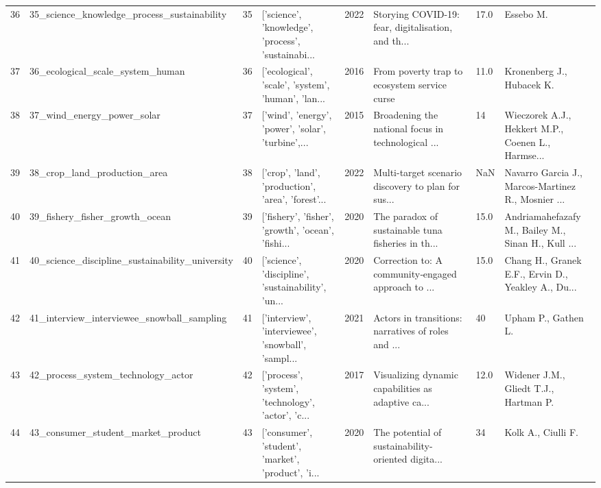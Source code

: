 \begin{tabular}{rlrlrlll}
         36 &        35\_science\_knowledge\_process\_sustainability &        35 & ['science', 'knowledge', 'process', 'sustainabi... &          2022 & Storying COVID-19: fear, digitalisation, and th... &    17.0 &                                          Essebo M. \\
         37 &                   36\_ecological\_scale\_system\_human &        36 & ['ecological', 'scale', 'system', 'human', 'lan... &          2016 &       From poverty trap to ecosystem service curse &    11.0 &                          Kronenberg J., Hubacek K. \\
         38 &                         37\_wind\_energy\_power\_solar &        37 & ['wind', 'energy', 'power', 'solar', 'turbine',... &          2015 & Broadening the national focus in technological ... &      14 & Wieczorek A.J., Hekkert M.P., Coenen L., Harmse... \\
         39 &                       38\_crop\_land\_production\_area &        38 & ['crop', 'land', 'production', 'area', 'forest'... &          2022 & Multi-target scenario discovery to plan for sus... &     NaN & Navarro Garcia J., Marcos-Martinez R., Mosnier ... \\
         40 &                     39\_fishery\_fisher\_growth\_ocean &        39 & ['fishery', 'fisher', 'growth', 'ocean', 'fishi... &          2020 & The paradox of sustainable tuna fisheries in th... &    15.0 & Andriamahefazafy M., Bailey M., Sinan H., Kull ... \\
         41 &    40\_science\_discipline\_sustainability\_university &        40 & ['science', 'discipline', 'sustainability', 'un... &          2020 & Correction to: A community‑engaged approach to ... &    15.0 & Chang H., Granek E.F., Ervin D., Yeakley A., Du... \\
         42 &         41\_interview\_interviewee\_snowball\_sampling &        41 & ['interview', 'interviewee', 'snowball', 'sampl... &          2021 & Actors in transitions: narratives of roles and ... &      40 &                                Upham P., Gathen L. \\
         43 &                 42\_process\_system\_technology\_actor &        42 & ['process', 'system', 'technology', 'actor', 'c... &          2017 & Visualizing dynamic capabilities as adaptive ca... &    12.0 &              Widener J.M., Gliedt T.J., Hartman P. \\
         44 &                 43\_consumer\_student\_market\_product &        43 & ['consumer', 'student', 'market', 'product', 'i... &          2020 & The potential of sustainability-oriented digita... &      34 &                                 Kolk A., Ciulli F. \\

\end{tabular}
